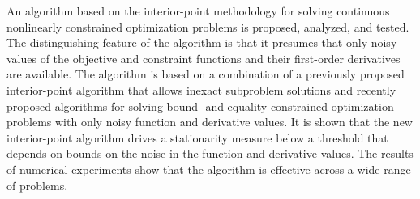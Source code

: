 An algorithm based on the interior-point methodology for solving continuous nonlinearly constrained optimization problems is proposed, analyzed, and tested.  The distinguishing feature of the algorithm is that it presumes that only noisy values of the objective and constraint functions and their first-order derivatives are available.  The algorithm is based on a combination of a previously proposed interior-point algorithm that allows inexact subproblem solutions and recently proposed algorithms for solving bound- and equality-constrained optimization problems with only noisy function and derivative values.  It is shown that the new interior-point algorithm drives a stationarity measure below a threshold that depends on bounds on the noise in the function and derivative values.  The results of numerical experiments show that the algorithm is effective across a wide range of problems.